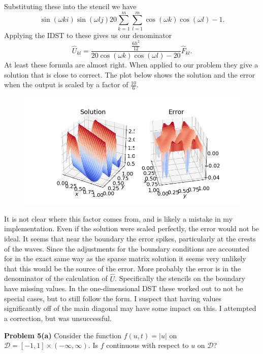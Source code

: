 \documentclass[12pt]{article}
\newcommand{\problem}[1]{\hspace{-4 ex} \large \textbf{Problem #1} }
\begin{document}
Substituting these into the stencil we have
$$
\sin(\omega ki)\sin(\omega lj) 20\sum_{k=1}^m\sum_{l=1}^m \cos(\omega k)\cos(\omega l) - 1.
$$
Applying the IDST to these gives us our denominator
$$
\hat{U}_{kl} = \frac{\frac{6h^2}{12}}{20\cos(\omega k)\cos(\omega l) - 20} \hat{F}_{kl}.
$$
%
At least these formula are almost right. When applied to our problem they give a solution that is close to correct. The plot below shows the solution and the error when the output is scaled by a factor of $\frac{10}{6}$. 
\begin{figure}[H]
	\centering
	\includegraphics[width=1\linewidth]{hw4_p4_c}
\end{figure}
It is not clear where this factor comes from, and is likely a mistake in my implementation. Even if the solution were scaled perfectly, the error would not be ideal. It seems that near the boundary the error spikes, particularly at the crests of the waves. Since the adjustments for the boundary conditions are accounted for in the exact same way as the sparse matrix solution it seems very unlikely that this would be the source of the error. More probably the error is in the denominator of the calculation of $\hat{U}$. Specifically the stencils on the boundary have missing values. In the one-dimensional DST these worked out to not be special cases, but to still follow the form. I suspect that having values significantly off of the main diagonal may have some impact on this. I attempted a correction, but was unsuccessful.


\bigbreak
\problem{5(a)} Consider the function $f(u,t) = |u|$ on $\mathcal{D}=[-1,1] \times (-\infty, \infty)$. Is $f$ continuous with respect to $u$ on $\mathcal{D}$? \bigbreak
\end{document}
